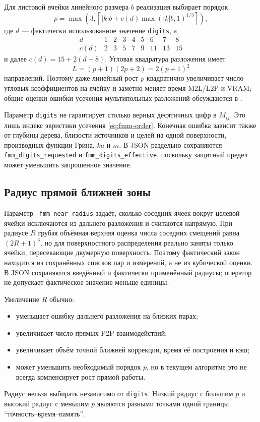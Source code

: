 \documentclass[12pt,a4paper]{article}
\begin{document}
Для листовой ячейки линейного размера $b$ реализация выбирает порядок
\begin{equation}
  p=\max\left(3,
  \left\lceil |k|b+c(d)\max(|k|b,1)^{1/3}\right\rceil\right),
  \label{eq:fmm-order}
\end{equation}
где $d$ --- фактически использованное значение \texttt{digits}, а
\begin{equation}
\begin{array}{c|cccccccc}
d&1&2&3&4&5&6&7&8\\ \hline
c(d)&2&3&5&7&9&11&13&15
\end{array}
\end{equation}
и далее $c(d)=15+2(d-8)$. Угловая квадратура разложения имеет
\begin{equation}
  L=(p+1)(2p+2)=2(p+1)^2
  \label{eq:fmm-directions}
\end{equation}
направлений. Поэтому даже линейный рост $p$ квадратично увеличивает число
угловых коэффициентов на ячейку и заметно меняет время M2L/L2P и VRAM;
общие оценки ошибки усечения мультипольных разложений обсуждаются в
\cite{ohnuki2003}.

Параметр \texttt{digits} не гарантирует столько верных десятичных цифр в
$M_{ij}$. Это лишь индекс эвристики усечения \eqref{eq:fmm-order}. Конечная
ошибка зависит также от глубины дерева, близости источников и целей на одной
поверхности, производных функции Грина, $ka$ и $m$. В JSON раздельно
сохраняются \texttt{fmm\_digits\_requested} и
\texttt{fmm\_digits\_effective}, поскольку защитный предел может уменьшить
запрошенное значение.

\subsection{Радиус прямой ближней зоны}

Параметр \texttt{--fmm-near-radius} задаёт, сколько соседних ячеек вокруг
целевой ячейки исключаются из дальнего разложения и считаются напрямую. При
радиусе $R$ грубая объёмная верхняя оценка числа соседних смещений равна
$(2R+1)^3$, но для поверхностного распределения реально заняты только ячейки,
пересекающие двумерную поверхность. Поэтому фактический закон находится из
сохранённых списков пар и измерений, а не из кубической оценки.
В JSON сохраняются введённый и фактически применённый радиусы; оператор не
допускает фактическое значение меньше единицы.

Увеличение $R$ обычно:
\begin{itemize}
  \item уменьшает ошибку дальнего разложения на близких парах;
  \item увеличивает число прямых P2P-взаимодействий;
  \item увеличивает объём точной ближней коррекции, время её построения и кэш;
  \item может уменьшить необходимый порядок $p$, но в текущем алгоритме это не
        всегда компенсирует рост прямой работы.
\end{itemize}
Радиус нельзя выбирать независимо от \texttt{digits}. Низкий радиус с большим
$p$ и высокий радиус с меньшим $p$ являются разными точками одной границы
``точность--время--память''.
\end{document}
